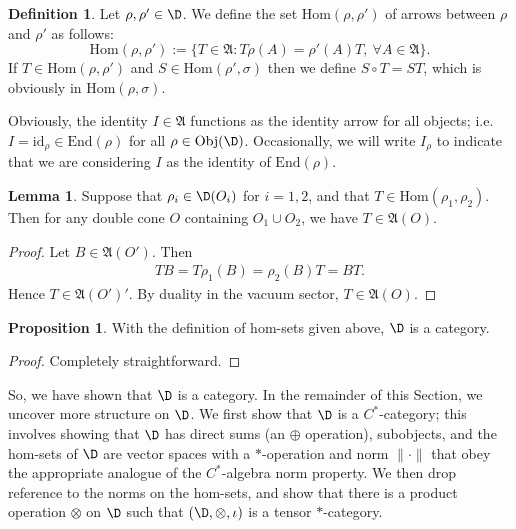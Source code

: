 \documentclass[11pt]{article}
\newcommand{\alg}[1]{\mathfrak{#1}}
\newcommand{\norm}[1]{\| #1\|}
\theoremstyle{definition}
\newtheorem{prop}[thm]{Proposition}
\newtheorem{lemma}[thm]{Lemma}
\theoremstyle{definition}
\newtheorem{defn}[thm]{Definition}
\theoremstyle{remark}
\newcommand{\Obj}{\mathrm{Obj}}
\newcommand{\Hom}{\mathrm{Hom}}
\newcommand{\End}{\mathrm{End}}
\def\id{\mathrm{id}}
\begin{document}
\begin{defn} Let $\rho ,\rho '\in \D$.  We define the set $\Hom (\rho ,\rho ')$ of
  arrows between $\rho$ and $\rho '$ as follows:
$$ \Hom (\rho ,\rho '):= \{ T\in \alg{A}:T\rho (A)=\rho '(A)T ,\: \forall A\in
\alg{A} \} .$$ If $T\in \Hom (\rho ,\rho ')$ and $S\in \Hom (\rho ',\sigma )$ then we
define $S\circ T=ST$, which is obviously in $\Hom (\rho ,\sigma )$.
\end{defn}

Obviously, the identity $I\in \alg{A}$ functions as the identity arrow for all
objects; i.e. $I=\id _{\rho}\in \End (\rho )$ for all $\rho \in \Obj (\D )$.
Occasionally, we will write $I_\rho$ to indicate that we are considering $I$ as the
identity of $\End (\rho )$.

  \begin{lemma} Suppose that $\rho _i\in \D (O_i)$ for $i=1,2$, and that $T\in \Hom
    (\rho _1,\rho _2)$.  Then for any double cone $O$ containing $O_1\cup O_2$, we
    have $T\in \alg{A}(O)$.  \label{twine} \end{lemma}

\begin{proof} Let $B\in \alg{A}(O')$.  Then 
  \begin{eqnarray*} TB = T\rho _1(B)=\rho _2(B)T =BT .\end{eqnarray*} Hence $T\in
  \alg{A}(O')'$.  By duality in the vacuum sector, $T\in \alg{A}(O)$.  \end{proof}

\begin{prop} With the definition of hom-sets given above, $\D$ is a category.
\end{prop}

\begin{proof} Completely straightforward.  \end{proof}

So, we have shown that $\D$ is a category.  In the remainder of this
Section, we uncover more structure on $\D$.  We first show that $\D$
is a $C^*$-category; this involves showing that $\D$ has direct sums
(an $\oplus$ operation), subobjects, and the hom-sets of $\D$ are
vector spaces with a $*$-operation and norm $\norm{\cdot}$ that obey
the appropriate analogue of the $C^*$-algebra norm property.  We then
drop reference to the norms on the hom-sets, and show that there is a
product operation $\otimes$ on $\D$ such that $(\D ,\otimes,\iota )$
is a tensor $*$-category.

\label{DHR-star}
\end{document}
